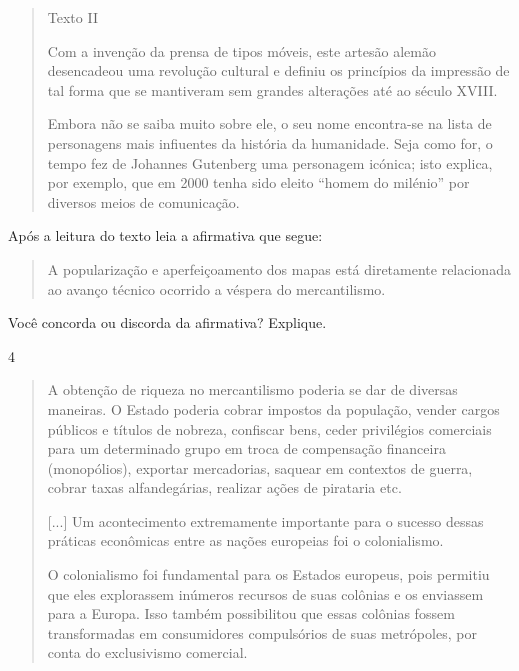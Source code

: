 \begin{quote}
Texto II

Com a invenção da prensa de tipos móveis, este artesão alemão
desencadeou uma revolução cultural e definiu os princípios da impressão
de tal forma que se mantiveram sem grandes alterações até ao século
XVIII.

Embora não se saiba muito sobre ele, o seu nome encontra-se na
lista de personagens mais infiuentes da história da humanidade. Seja
como for, o tempo fez de Johannes Gutenberg uma personagem icónica; isto
explica, por exemplo, que em 2000 tenha sido eleito ``homem do milénio''
por diversos meios de comunicação.

\end{quote}

Após a leitura do texto leia a afirmativa que segue:

\begin{quote}
A popularização e aperfeiçoamento dos mapas está diretamente relacionada
ao avanço técnico ocorrido a véspera do mercantilismo.
\end{quote}

Você concorda ou discorda da afirmativa? Explique.

\linhas[4]


\num{4}

\begin{quote}
A obtenção de riqueza no mercantilismo poderia se dar de diversas
maneiras. O Estado poderia cobrar impostos da população, vender cargos
públicos e títulos de nobreza, confiscar bens, ceder privilégios
comerciais para um determinado grupo em troca de compensação financeira
(monopólios), exportar mercadorias, saquear em contextos de guerra,
cobrar taxas alfandegárias, realizar ações de pirataria
etc.

{[}...{]} Um acontecimento extremamente importante para o sucesso
dessas práticas econômicas entre as nações europeias foi o
colonialismo.

O colonialismo foi fundamental para os Estados europeus, pois
permitiu que eles explorassem inúmeros recursos de suas colônias e os
enviassem para a Europa. Isso também possibilitou que essas colônias
fossem transformadas em consumidores compulsórios de suas metrópoles,
por conta do exclusivismo comercial.

\end{quote}

